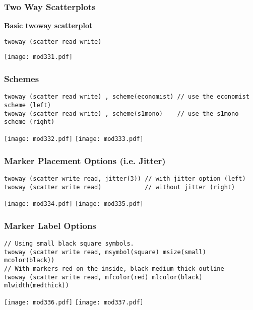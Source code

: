 \subsubsection{Two Way Scatterplots}
\textbf{Basic twoway scatterplot}
\begin{lstlisting}
twoway (scatter read write)
\end{lstlisting}
\begin{center}
\texttt{[image: mod331.pdf]}
\end{center}

\subsubsection{Schemes}
\begin{lstlisting}
twoway (scatter read write) , scheme(economist) // use the economist scheme (left)
twoway (scatter read write) , scheme(s1mono)    // use the s1mono scheme (right)
\end{lstlisting}
\begin{center}
\texttt{[image: mod332.pdf]}
\texttt{[image: mod333.pdf]}
\end{center}

\subsubsection{Marker Placement Options (i.e. Jitter)}
\begin{lstlisting}
twoway (scatter write read, jitter(3)) // with jitter option (left)
twoway (scatter write read)            // without jitter (right)
\end{lstlisting}
\begin{center}
\texttt{[image: mod334.pdf]}
\texttt{[image: mod335.pdf]}
\end{center}

\subsubsection{Marker Label Options}
\begin{lstlisting}
// Using small black square symbols.
twoway (scatter write read, msymbol(square) msize(small) mcolor(black))
// With markers red on the inside, black medium thick outline
twoway (scatter write read, mfcolor(red) mlcolor(black) mlwidth(medthick))
\end{lstlisting}
\begin{center}
\texttt{[image: mod336.pdf]}
\texttt{[image: mod337.pdf]}
\end{center}


